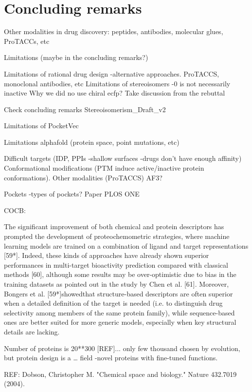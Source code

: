 \chapter{Concluding remarks}
\label{concluding_remarks}




Other modalities in drug discovery: peptides, antibodies, molecular glues, ProTACCs, etc



Limitations (maybe in the concluding remarks?)

Limitations of rational drug design -alternative approaches. ProTACCS, monoclonal antibodies, etc
Limitations of stereoisomers -0 is not necessarily inactive
Why we did no use chiral ecfp? Take discussion from the rebuttal

Check concluding remarks Stereoisomerism\_Draft\_v2


Limitations of PocketVec

Limitations alphafold (protein space, point mutations, etc)



Difficult targets (IDP, PPIs -shallow surfaces -drugs don't have enough affinity)
Conformational modifications (PTM induce active/inactive protein conformations).
Other modalities (ProTACCS)
AF3?

Pockets -types of pockets? Paper PLOS ONE 



COCB:

The significant improvement of both chemical and protein descriptors has prompted the development of proteochemometric strategies, where machine learning models are trained on a combination of ligand and target representations [59*]. Indeed, these kinds of approaches have already shown superior performances in multi-target bioactivity prediction compared with classical methods [60], although some results may be over-optimistic due to bias in the training datasets as pointed out in the study by Chen et al. [61]. Moreover, Bongers et al. [59*]showedthat structure-based descriptors are often superior when a detailed definition of the target is needed (i.e. to distinguish drug selectivity among members of the same protein family), while sequence-based ones are better suited for more generic models, especially when key structural details are lacking.



Number of proteins is 20**300 [REF]... only few thousand chosen by evolution, but protein design is a … field -novel proteins with fine-tuned functions. 

REF: Dobson, Christopher M. "Chemical space and biology." Nature 432.7019 (2004).

